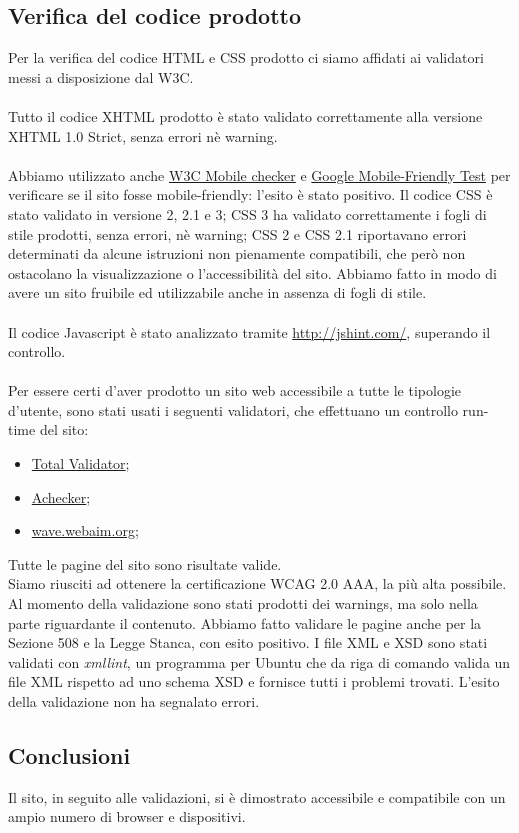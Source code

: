 {	\subsection{Verifica del codice prodotto}{
		Per la verifica del codice HTML e CSS prodotto ci siamo affidati ai validatori messi a disposizione dal W3C.\\
		\\
		Tutto il codice XHTML prodotto è stato validato correttamente alla versione XHTML 1.0 Strict, senza errori nè warning.\\
		\\
		Abbiamo utilizzato anche \href{https://validator.w3.org/mobile-alpha/}{W3C Mobile checker} e \href{https://www.google.com/webmasters/tools/mobile-friendly/}{Google Mobile-Friendly Test} per verificare se il sito fosse mobile-friendly: l'esito è stato positivo.
		Il codice CSS è stato validato in versione 2, 2.1 e 3; CSS 3 ha validato correttamente i fogli di stile prodotti, senza errori, nè warning; CSS 2 e CSS 2.1 riportavano errori determinati da alcune istruzioni non pienamente compatibili, che però non ostacolano la visualizzazione o l'accessibilità del sito. Abbiamo fatto in modo di avere un sito fruibile ed utilizzabile anche in assenza di fogli di stile.\\
		\\
		Il codice Javascript è stato analizzato tramite \url{http://jshint.com/}, superando il controllo.\\
		\\
		Per essere certi d'aver prodotto un sito web accessibile a tutte le tipologie d'utente, sono stati usati i seguenti validatori, che effettuano un controllo run-time del sito:
		\begin{itemize}\itemsep1pt
			\item \href{https://www.totalvalidator.com/}{Total Validator};
			\item \href{http://achecker.ca/checker/index.php}{Achecker};
			\item \href{http://wave.webaim.org/}{wave.webaim.org};
		\end{itemize}
		Tutte le pagine del sito sono risultate valide.\\
		Siamo riusciti ad ottenere la certificazione WCAG 2.0 AAA, la più alta possibile. Al momento della validazione sono stati prodotti dei warnings, ma solo nella parte riguardante il contenuto. Abbiamo fatto validare le pagine anche per la Sezione 508 e la Legge Stanca, con esito positivo.
		I file XML e XSD sono stati validati con \textit{xmllint}, un programma per Ubuntu che da riga di comando valida un file XML rispetto ad uno schema XSD e fornisce tutti i problemi trovati. L'esito della validazione non ha segnalato errori.
	}
	\subsection{Conclusioni}
		Il sito, in seguito alle validazioni, si è dimostrato accessibile e compatibile con un ampio numero di browser e dispositivi.
}